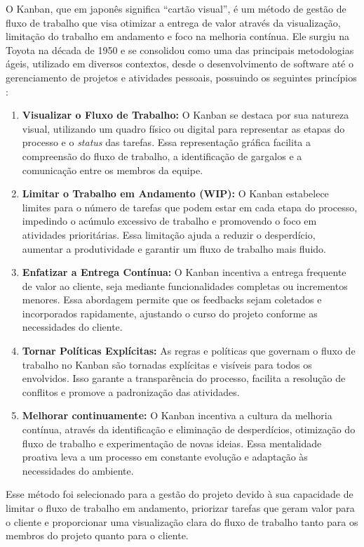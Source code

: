 O Kanban, que em japonês significa \enquote{cartão visual}, é um método de gestão de fluxo de trabalho que visa otimizar a entrega de valor através da visualização, limitação do trabalho em andamento e foco na melhoria contínua. Ele surgiu na Toyota na década de 1950 e se consolidou como uma das principais metodologias ágeis, utilizado em diversos contextos, desde o desenvolvimento de software até o gerenciamento de projetos e atividades pessoais, possuindo os seguintes princípios \cite{kanban:explicacao}:
\begin{enumerate}
    \item \textbf{Visualizar o Fluxo de Trabalho:} O Kanban se destaca por sua natureza visual, utilizando um quadro físico ou digital para representar as etapas do processo e o \textit{status} das tarefas. Essa representação gráfica facilita a compreensão do fluxo de trabalho, a identificação de gargalos e a comunicação entre os membros da equipe.
    
    \item \textbf{Limitar o Trabalho em Andamento (WIP):} O Kanban estabelece limites para o número de tarefas que podem estar em cada etapa do processo, impedindo o acúmulo excessivo de trabalho e promovendo o foco em atividades prioritárias. Essa limitação ajuda a reduzir o desperdício, aumentar a produtividade e garantir um fluxo de trabalho mais fluido.
    
    \item \textbf{Enfatizar a Entrega Contínua:} O Kanban incentiva a entrega frequente de valor ao cliente, seja mediante funcionalidades completas ou incrementos menores. Essa abordagem permite que os feedbacks sejam coletados e incorporados rapidamente, ajustando o curso do projeto conforme as necessidades do cliente.
    
    \item \textbf{Tornar Políticas Explícitas:} As regras e políticas que governam o fluxo de trabalho no Kanban são tornadas explícitas e visíveis para todos os envolvidos. Isso garante a transparência do processo, facilita a resolução de conflitos e promove a padronização das atividades.

    \item \textbf{Melhorar continuamente:} O Kanban incentiva a cultura da melhoria contínua, através da identificação e eliminação de desperdícios, otimização do fluxo de trabalho e experimentação de novas ideias. Essa mentalidade proativa leva a um processo em constante evolução e adaptação às necessidades do ambiente.
    
\end{enumerate}

Esse método foi selecionado para a gestão do projeto devido à sua capacidade de limitar o fluxo de trabalho em andamento, priorizar tarefas que geram valor para o cliente e proporcionar uma visualização clara do fluxo de trabalho tanto para os membros do projeto quanto para o cliente.
